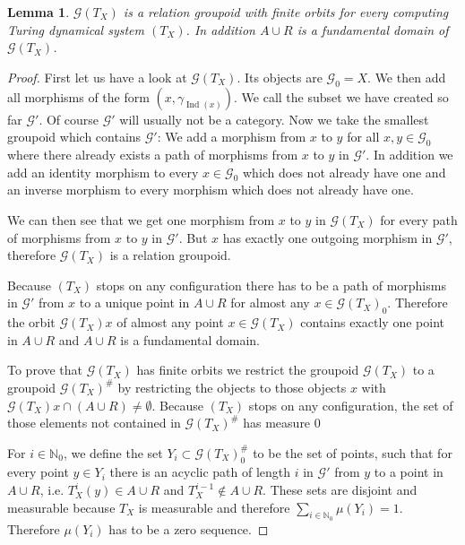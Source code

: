 \documentclass[12pt,a4paper]{scrartcl}
\theoremstyle{plain}
\newtheorem{Lemma}[Theorem]{Lemma}
\theoremstyle{definition}
\newcommand{\N}{\mathbb{N}} %
\newcommand{\2}{\mathbb{Z} / 2 \mathbb{Z}}
\newcommand{\G}{\mathcal{G}}
\newcommand{\1}{\bar{1}}
\newcommand{\0}{\bar{0}}
\newcommand{\Ind}{\operatorname{Ind}}
\begin{document}
\begin{Lemma} \label{TX_rel_groupoid}
	$\G (T_X)$ is a relation groupoid with finite orbits for every computing Turing dynamical system $(T_X)$. In addition $A \cup R$ is a fundamental domain of $\G (T_X)$.
\end{Lemma}
\begin{proof}
	First let us have a look at $\G (T_X)$. Its objects are $\G_0 = X$. We then add all morphisms of the form $(x, \gamma_{\Ind(x)})$. We call the subset we have created so far $\G'$. Of course $\G'$ will usually not be a category. Now we take the smallest groupoid which contains $\G'$: We add a morphism from $x$ to $y$ for all $x, y \in \G_0$ where there already exists a path of morphisms from $x$ to $y$ in $\G'$. In addition we add an identity morphism to every $ x\in \G_0$ which does not already have one and an inverse morphism to every morphism which does not already have one. 
	
	We can then see that we get one morphism from $x$ to $y$ in $\G (T_X)$ for every path of morphisms from $x$ to $y$ in $\G'$. But $x$ has exactly one outgoing morphism in $\G'$, therefore $\G (T_X)$ is a relation groupoid.

	Because $(T_X)$ stops on any configuration there has to be a path of morphisms in $\G'$ from $x$ to a unique point in $A \cup R$ for almost any $x \in \G (T_X)_0$. Therefore the orbit $\G (T_X)x$ of almost any point $x \in \G (T_X)$ contains exactly one point in $A \cup R$ and $A \cup R$ is a fundamental domain.
	
	To prove that $\G (T_X)$ has finite orbits we restrict the groupoid $\G (T_X)$ to a groupoid $\G (T_X)^\#$ by restricting the objects to those objects $x$ with $\G (T_X)x \cap (A \cup R) \neq \emptyset$. Because $(T_X)$ stops on any configuration, the set of those elements not contained in $\G (T_X)^\#$ has measure $0$
	
	For $i \in \N_0$, we define the set $Y_i \subset \G (T_X)_0^\#$ to be the set of points, such that for every point $y \in Y_i$ there is an acyclic path of length $i$ in $\G'$ from $y$ to a point in $A \cup R$, i.e. $T_X^i(y) \in A \cup R$ and $T_X^{i-1} \notin A \cup R$. These sets are disjoint and measurable because $T_X$ is measurable and therefore $\sum_{i \in \N_0} \mu(Y_i) = 1$. Therefore $\mu(Y_i)$ has to be a zero sequence.
	

\end{proof}
\end{document}
